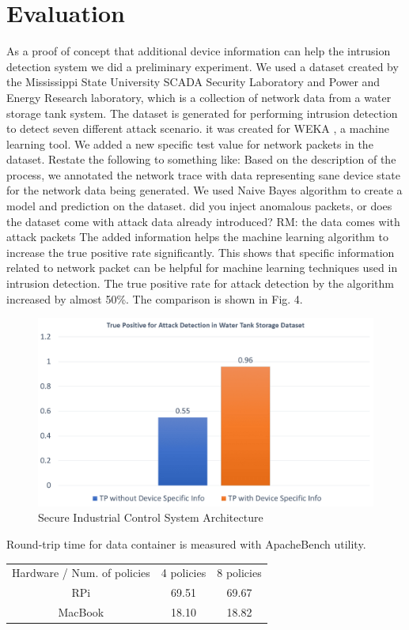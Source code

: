 \documentclass[conference]{IEEEtran}
\begin{document}
\section{Evaluation}
As a proof of concept that additional device information can help the intrusion detection system we did a preliminary experiment. We used a dataset \cite{c7} created by the Mississippi State University SCADA Security Laboratory and Power and Energy Research laboratory, which is a collection of network data from a water storage tank system. The dataset is generated for performing intrusion detection to detect seven different attack scenario. it was created for WEKA \cite{c8}, a machine learning tool. We added a new specific test value for network packets in the dataset.
{\color{red} Restate the following to something like: Based on the description of the process, we annotated the network trace with data representing sane device state for the network data being generated.} We used Naive Bayes algorithm to create a model and prediction on the dataset. {\color{red} did you inject anomalous packets, or does the dataset come with attack data already introduced? RM: the data comes with attack packets} The added information helps the machine learning algorithm to increase the true positive rate significantly. This shows that specific information related to network packet can be helpful for machine learning techniques used in intrusion detection. The true positive rate for attack detection by the algorithm increased by almost 50\%. The comparison is shown in Fig. 4.
\begin{figure}[htbp]
\centering
\centerline{\includegraphics [width=.5\textwidth]{chart.png}}
\caption{Secure Industrial Control System Architecture}
\label{SICSA}
%
\end{figure}

Round-trip time for data container is measured with ApacheBench utility. 
\begin{center}
\begin{tabular}{ |c|c|c| } 
 \hline
Hardware / Num. of policies & 4 policies & 8 policies \\ 
RPi & 69.51 & 69.67 \\
MacBook & 18.10 & 18.82 \\
 \hline
\end{tabular}
\end{center}
\end{document}
